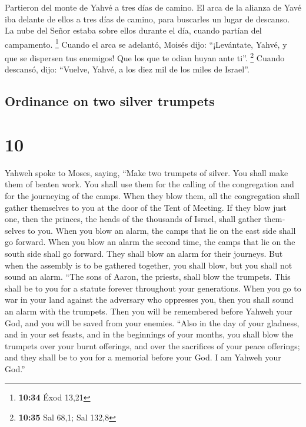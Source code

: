 \begin{paracol}{2}
 Partieron del monte de Yahvé a tres días de camino. El
arca de la alianza de Yavé iba delante de ellos a tres días de camino,
para buscarles un lugar de descanso.  La nube del Señor
estaba sobre ellos durante el día, cuando partían del campamento.
\footnote{\textbf{10:34} Éxod 13,21}  Cuando el arca se
adelantó, Moisés dijo: ``¡Levántate, Yahvé, y que se dispersen tus
enemigos! Que los que te odian huyan ante ti''. \footnote{\textbf{10:35}
  Sal 68,1; Sal 132,8}  Cuando descansó, dijo: ``Vuelve,
Yahvé, a los diez mil de los miles de Israel''.

\switchcolumn
\begin{otherlanguage}{english}

\hypertarget{ordinance-on-two-silver-trumpets}{%
\subsection{Ordinance on two silver
trumpets}\label{ordinance-on-two-silver-trumpets}}

\hypertarget{section-19}{%
\section{10}\label{section-19}}

 Yahweh spoke to Moses, saying,  ``Make two
trumpets of silver. You shall make them of beaten work. You shall use
them for the calling of the congregation and for the journeying of the
camps.  When they blow them, all the congregation shall
gather themselves to you at the door of the Tent of Meeting.
 If they blow just one, then the princes, the heads of the
thousands of Israel, shall gather themselves to you.  When
you blow an alarm, the camps that lie on the east side shall go forward.
 When you blow an alarm the second time, the camps that
lie on the south side shall go forward. They shall blow an alarm for
their journeys.  But when the assembly is to be gathered
together, you shall blow, but you shall not sound an alarm.
 ``The sons of Aaron, the priests, shall blow the
trumpets. This shall be to you for a statute forever throughout your
generations.  When you go to war in your land against the
adversary who oppresses you, then you shall sound an alarm with the
trumpets. Then you will be remembered before Yahweh your God, and you
will be saved from your enemies.  ``Also in the day of
your gladness, and in your set feasts, and in the beginnings of your
months, you shall blow the trumpets over your burnt offerings, and over
the sacrifices of your peace offerings; and they shall be to you for a
memorial before your God. I am Yahweh your God.''


\end{otherlanguage}
\end{paracol}
